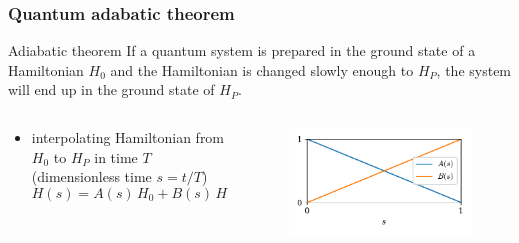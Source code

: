 \documentclass[11pt]{beamer}
\newcommand{\itemb}{\item[$\bullet$]}
\begin{document}
\begin{frame}
    \frametitle{Quantum adabatic theorem}
    \begin{block}{Adiabatic theorem}
        If a quantum system is prepared in the ground state of a Hamiltonian $H_0$
        and the Hamiltonian is changed slowly enough to $H_P$, the system will end up in the ground state of $H_P$.
    \end{block}
    \begin{columns}[T]
        \begin{column}{0.55\textwidth}
            \begin{itemize}
                \itemb interpolating Hamiltonian from $H_0$ to $H_P$
                in time $T$ (dimensionless time $s = t/T$)
                \begin{equation*}
                    H(s) = A(s) \, H_0 + B(s) \, H_P
                \end{equation*}
            \end{itemize}
        \end{column}
        \begin{column}{0.45\textwidth}
            \begin{figure}[!htb]
                \includegraphics[width=\textwidth]{../plots/interpolating_functions.pdf}
            \end{figure}
        \end{column}
    \end{columns}
\end{frame}
\end{document}
